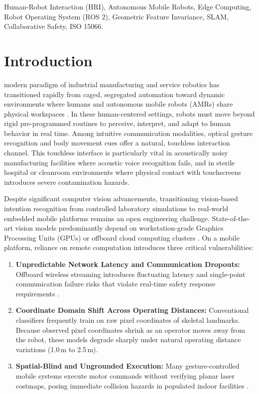\documentclass[journal]{IEEEtran}
\begin{document}
\begin{IEEEkeywords}
Human-Robot Interaction (HRI), Autonomous Mobile Robots, Edge Computing, Robot Operating System (ROS 2), Geometric Feature Invariance, SLAM, Collaborative Safety, ISO 15066.
\end{IEEEkeywords}

\section{Introduction}
 modern paradigm of industrial manufacturing and service robotics has transitioned rapidly from caged, segregated automation toward dynamic environments where humans and autonomous mobile robots (AMRs) share physical workspaces \cite{iso150662016}. In these human-centered settings, robots must move beyond rigid pre-programmed routines to perceive, interpret, and adapt to human behavior in real time. Among intuitive communication modalities, optical gesture recognition and body movement cues offer a natural, touchless interaction channel. This touchless interface is particularly vital in acoustically noisy manufacturing facilities where acoustic voice recognition fails, and in sterile hospital or cleanroom environments where physical contact with touchscreens introduces severe contamination hazards.

Despite significant computer vision advancements, transitioning vision-based intention recognition from controlled laboratory simulations to real-world embedded mobile platforms remains an open engineering challenge. State-of-the-art vision models predominantly depend on workstation-grade Graphics Processing Units (GPUs) or offboard cloud computing clusters \cite{mahmud2022}. On a mobile platform, reliance on remote computation introduces three critical vulnerabilities:
\begin{enumerate}
    \item \textbf{Unpredictable Network Latency and Communication Dropouts:} Offboard wireless streaming introduces fluctuating latency and single-point communication failure risks that violate real-time safety response requirements \cite{tsitos2022}.
    \item \textbf{Coordinate Domain Shift Across Operating Distances:} Conventional classifiers frequently train on raw pixel coordinates of skeletal landmarks. Because observed pixel coordinates shrink as an operator moves away from the robot, these models degrade sharply under natural operating distance variations (1.0\,m to 2.5\,m).
    \item \textbf{Spatial-Blind and Ungrounded Execution:} Many gesture-controlled mobile systems execute motor commands without verifying planar laser costmaps, posing immediate collision hazards in populated indoor facilities \cite{li2023}.
\end{enumerate}
\end{document}
